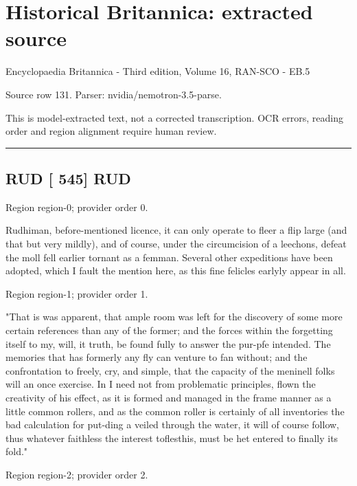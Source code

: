 \documentclass[11pt]{article}
\begin{document}
\section*{Historical Britannica: extracted source}
Encyclopaedia Britannica - Third edition, Volume 16, RAN-SCO - EB.5\par
{\small Source row 131. Parser: nvidia/nemotron-3.5-parse.\par}
{\small This is model-extracted text, not a corrected transcription. OCR errors, reading order and region alignment require human review.\par}
\hrule\medskip
\subsection*{RUD [ 545] RUD}

{\scriptsize\color{gray} Region region-0; provider order 0.\par}
\medskip

Rudhiman, before-mentioned licence, it can only operate to fleer a flip large (and that but very mildly), and of course, under the circumcision of a leechons, defeat the moll fell earlier tornant as a femman. Several other expeditions have been adopted, which I fault the mention here, as this fine felicles earlyly appear in all.
\par

{\scriptsize\color{gray} Region region-1; provider order 1.\par}
\medskip

"That is was apparent, that ample room was left for the discovery of some more certain references than any of the former; and the forces within the forgetting itself to my, will, it truth, be found fully to answer the pur-pfe intended. The memories that has formerly any fly can venture to fan without; and the confrontation to freely, cry, and simple, that the capacity of the meninell folks will an once exercise. In I need not from problematic principles, flown the creativity of his effect, as it is formed and managed in the frame manner as a little common rollers, and as the common roller is certainly of all inventories the bad calculation for put-ding a veiled through the water, it will of course follow, thus whatever faithless the interest toflesthis, must be het entered to finally its fold."
\par

{\scriptsize\color{gray} Region region-2; provider order 2.\par}
\medskip
\end{document}
